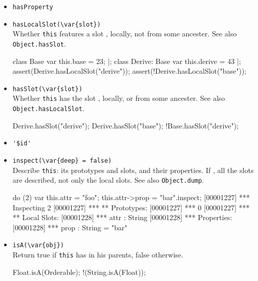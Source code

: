 \begin{itemize}
\item \lstinline|hasProperty|\\

\item \lstinline|hasLocalSlot(\var{slot})|\\
  Whether \lstinline|this| features a slot , locally, not
  from some ancester.  See also \lstinline|Object.hasSlot|.

\begin{urbiscript}[firstnumber=last]
class Base         { var this.base = 23; } |;
class Derive: Base { var this.derive = 43 } |;
assert(Derive.hasLocalSlot("derive"));
assert(!Derive.hasLocalSlot("base"));
\end{urbiscript}

\item \lstinline|hasSlot(\var{slot})|\\
  Whether \lstinline|this| has the slot , locally, or from
  some ancester.  See also \lstinline|Object.hasLocalSlot|.

\begin{urbiassert}[firstnumber=last]
Derive.hasSlot("derive");
Derive.hasSlot("base");
!Base.hasSlot("derive");
\end{urbiassert}

\item \lstinline|'$id'|\\ %

\item \lstinline|inspect(\var{deep} = false)|\\
  Describe \lstinline|this|: its prototypes and slots, and their
  properties.  If , all the slots are described, not only
  the local slots. See also \lstinline|Object.dump|.
\begin{urbiscript}[firstnumber=last]
do (2) { var this.attr = "foo"; this.attr->prop = "bar"}.inspect;
[00001227] *** Inspecting 2
[00001227] *** ** Prototypes:
[00001227] ***   0
[00001227] *** ** Local Slots:
[00001228] ***   attr : String
[00001228] ***     Properties:
[00001228] ***      prop : String = "bar"
\end{urbiscript}

\item \lstinline|isA(\var{obj})|\\
  Return true if \lstinline|this| has  in his parents, false
  otherwise.

\begin{urbiassert}[firstnumber=last]
Float.isA(Orderable);
!(String.isA(Float));
\end{urbiassert}


\end{itemize}
